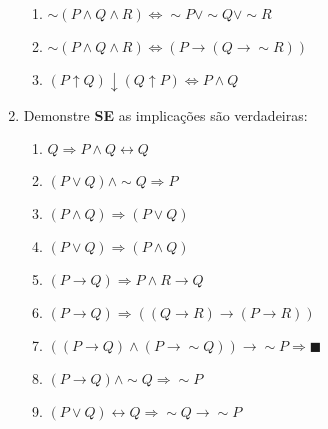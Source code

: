 \documentclass[12pt, a4paper,final]{article}
\begin{document}
\begin{enumerate}
\begin{enumerate}[label=(\alph*)]
            \item $\sim (P \wedge Q \wedge R) \Leftrightarrow \sim P \vee \sim Q \vee \sim R$ %
            
            \item $\sim (P \wedge Q \wedge R) \Leftrightarrow (P \rightarrow (Q \rightarrow \sim R))$ %
            
            \item $(P \uparrow Q) \downarrow (Q \uparrow P) \Leftrightarrow P \wedge Q$ %
        \end{enumerate}
        
        \item Demonstre \textbf{SE} as implicações são verdadeiras:
        
        \begin{enumerate}[label=(\alph*)]
            \item $Q \Rightarrow P \wedge Q \leftrightarrow Q$ %
            
            \item $(P \vee Q) \wedge \sim Q \Rightarrow P$ %
            
            \item $(P \wedge Q) \Rightarrow (P \vee Q)$ %
            
            \item $(P \vee Q) \Rightarrow (P \wedge Q)$ %
            
            \item $(P \rightarrow Q) \Rightarrow P \wedge R \rightarrow Q$ %
            
            \item $(P \rightarrow Q) \Rightarrow ((Q \rightarrow R) \rightarrow (P \rightarrow R))$ %
            
            \item $((P \rightarrow Q) \wedge (P \rightarrow \sim Q)) \rightarrow \sim P \Rightarrow \blacksquare$ %
            
            \item $(P \rightarrow Q) \wedge  \sim Q \Rightarrow \sim P$ %
            
            \item $(P \vee Q ) \leftrightarrow Q \Rightarrow \sim Q \rightarrow \sim P$ %
            

\end{enumerate}
\end{enumerate}
\end{document}
